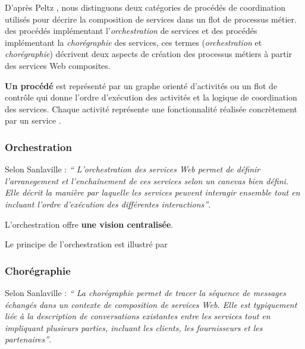       D'après Peltz \cite{peltz2003web}, nous distinguons deux
      catégories de procédés de coordination utilisés pour décrire la
      composition de services dans un flot de processus métier. des
      procédés implémentant l'\emph{orchestration} de services et des
      procédés implémentant la \emph{chorégraphie} des services, ces
      termes (\textit{orchestration} et \textit{chorégraphie}) décrivent
      deux aspects de création des processus métiers à partir des
      services Web composites.

      \textbf{Un procédé} est représenté par un graphe orienté
      d'activités ou un flot de contrôle qui donne l'ordre d'exécution
      des activités et la logique de coordination des services. Chaque
      activité représente une fonctionnalité réalisée concrètement par
      un service \cite{chollet2009orchestration}.


        \subsubsection{Orchestration}
        \label{sec:orchestration}
        Selon Sanlaville \cite{jamal2005environnement} : \emph{``
          L'orchestration des services Web permet de définir
          l'arranegement et l'enchaînement de ces services selon un
          canevas bien défini. Elle décrit la manière par laquelle les
          services peuvent interagir ensemble tout en incluant l'ordre
          d'exécution des différentes interactions''}.

        L'orchestration offre \textbf{une vision centralisée}.

        Le principe de l'orchestration est illustré par

        \subsubsection{Chorégraphie}
        \label{sec:choregraphie}
        Selon Sanlaville \cite{jamal2005environnement} : \emph{`` La
          chorégraphie permet de tracer la séquence de messages
          échangés dans un contexte de composition de services
          Web. Elle est typiquement liée à la description de
          conversations existantes entre les services tout en
          impliquant plusieurs parties, incluant les clients, les
          fournisseurs et les partenaires''}.

